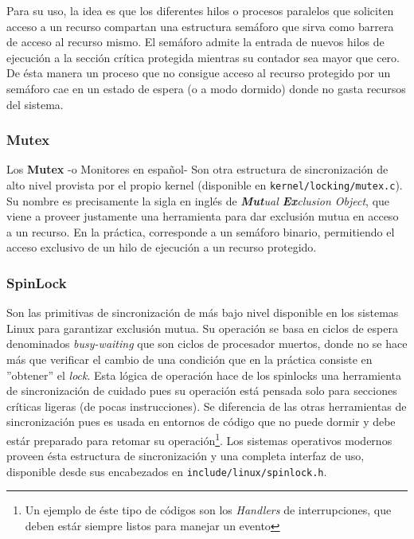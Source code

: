 Para su uso, la idea es que los diferentes hilos o procesos paralelos que soliciten acceso a un recurso compartan una estructura semáforo que sirva como barrera de acceso al recurso mismo. El semáforo admite la entrada de nuevos hilos de ejecución a la sección crítica protegida mientras su contador sea mayor que cero. De ésta manera un proceso que no consigue acceso al recurso protegido por un semáforo cae en un estado de espera (o a modo dormido) donde no gasta recursos del sistema.

\subsubsection{Mutex}
Los \textbf{Mutex} -o Monitores en español- Son otra estructura de sincronización de alto nivel provista por el propio kernel (disponible en \verb=kernel/locking/mutex.c=). Su nombre es precisamente la sigla en inglés de \emph{\textbf{Mut}ual \textbf{Ex}clusion Object}, que viene a proveer justamente una herramienta para dar exclusión mutua en acceso a un recurso. En la práctica, corresponde a un semáforo binario, permitiendo el acceso exclusivo de un hilo de ejecución a un recurso protegido.

\subsubsection{SpinLock}
Son las primitivas de sincronización de más bajo nivel disponible en los sistemas Linux para garantizar exclusión mutua. Su operación se basa en ciclos de espera denominados \emph{busy-waiting} que son ciclos de procesador muertos, donde no se hace más que verificar el cambio de una condición que en la práctica consiste en ''obtener'' el \emph{lock}. Esta lógica de operación hace de los spinlocks una herramienta de sincronización de cuidado pues su operación está pensada solo para secciones críticas ligeras (de pocas instrucciones). Se diferencia de las otras herramientas de sincronización pues es usada en entornos de código que no puede dormir y debe estár preparado para retomar su operación\footnote{Un ejemplo de éste tipo de códigos son los \textit{Handlers} de interrupciones, que deben estár siempre listos para manejar un evento}. Los sistemas operativos modernos proveen ésta estructura de sincronización y una completa interfaz de uso, disponible desde sus encabezados en \verb=include/linux/spinlock.h=.

